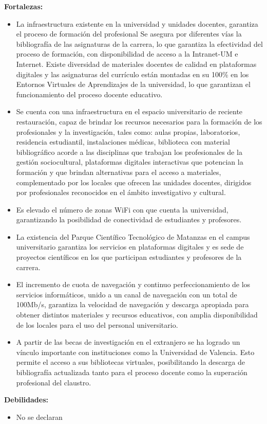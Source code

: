 \textbf{Fortalezas:}

\begin{itemize}
	\setlength\itemsep{-0.5em}
	\item La infraestructura existente en la universidad y unidades docentes, garantiza el proceso de formación del profesional Se asegura por diferentes vías la bibliografía de las asignaturas de la carrera, lo que garantiza la efectividad del proceso de formación, con disponibilidad de acceso a la Intranet-UM e Internet. Existe diversidad de materiales docentes de calidad en plataformas digitales y las asignaturas del currículo están montadas en su 100\% en los Entornos Virtuales de Aprendizajes de la universidad, lo que garantizan el funcionamiento del proceso docente educativo.
	\item Se cuenta con una infraestructura en el espacio universitario de reciente restauración, capaz de brindar los recursos necesarios para la formación de los profesionales y la investigación, tales como: aulas propias, laboratorios, residencia estudiantil, instalaciones médicas, biblioteca con material bibliográfico acorde a las disciplinas que trabajan los profesionales de la gestión sociocultural, plataformas digitales interactivas que potencian la formación y que brindan alternativas para el acceso a materiales, complementado por los locales que ofrecen las unidades docentes, dirigidos por profesionales reconocidos en el ámbito investigativo y cultural. 
	\item Es elevado el número de zonas WiFi con que cuenta la universidad, garantizando la posibilidad de conectividad de estudiantes y profesores.
	\item La existencia del Parque Científico Tecnológico de Matanzas en el campus universitario garantiza los servicios en plataformas digitales y es sede de proyectos científicos en los que participan estudiantes y profesores de la carrera.
	\item El incremento de cuota de navegación y continuo perfeccionamiento de los servicios informáticos, unido a un canal de navegación con un total de 100Mb/s, garantiza la velocidad de navegación y descarga apropiada para obtener distintos materiales y recursos educativos, con amplia disponibilidad de los locales para el uso del personal universitario.
	\item A partir de las becas de investigación en el extranjero se ha logrado un vínculo importante con instituciones como la Universidad de Valencia. Esto permite el acceso a sus bibliotecas virtuales, posibilitando la descarga de bibliografía actualizada tanto para el proceso docente como la superación profesional del claustro.
\end{itemize}

\textbf{Debilidades:}
\begin{itemize}
	\setlength\itemsep{-0.5em}
	\item No se declaran
\end{itemize}